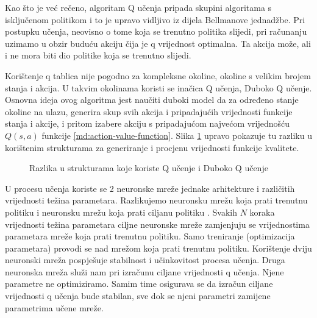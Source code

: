 Kao što je već rečeno, algoritam Q učenja pripada skupini algoritama s isključenom politikom i to je upravo vidljivo iz dijela Bellmanove jednadžbe. Pri postupku učenja, neovisno o tome koja se trenutno politika slijedi, pri računanju uzimamo u obzir buduću akciju čija je q vrijednost optimalna. Ta akcija može, ali i ne mora biti dio politike koja se trenutno slijedi. 



Korištenje q tablica nije pogodno za kompleksne okoline, okoline s velikim brojem stanja i akcija. U takvim okolinama koristi se inačica Q učenja, Duboko Q učenje. Osnovna ideja ovog algoritma jest naučiti duboki model da za određeno stanje okoline na ulazu, generira skup svih akcija i pripadajućih vrijednosti funkcije stanja i akcije, i pritom izabere akciju s pripadajućom najvećom vrijednošću $Q(s, a)$ funkcije \ref{md:action-value-function}. Slika \ref{fig:q-learning} upravo pokazuje tu razliku u korištenim strukturama za generiranje i procjenu vrijednosti funkcije kvalitete.

\begin{figure}[H]
    \centering
    \caption{Razlika u strukturama koje koriste Q učenje i Duboko Q učenje}
    \label{fig:q-learning}
\end{figure}


U procesu učenja koriste se 2 neuronske mreže jednake arhitekture i različitih vrijednosti težina parametara. Razlikujemo neuronsku mrežu koja prati trenutnu politiku  i neuronsku mrežu koja prati ciljanu politiku . Svakih $N$ koraka vrijednosti težina parametara ciljne neuronske mreže zamjenjuju se vrijednostima parametara mreže koja prati trenutnu politiku. Samo treniranje (optimizacija parametara) provodi se nad mrežom koja prati trenutnu politiku. Korištenje dviju neuronski mreža pospješuje stabilnost i učinkovitost procesa učenja. Druga neuronska mreža služi nam pri izračunu ciljane vrijednosti q učenja. Njene parametre ne optimiziramo. Samim time osigurava se da izračun ciljane vrijednosti q učenja bude stabilan, sve dok se njeni parametri zamijene parametrima učene mreže.

